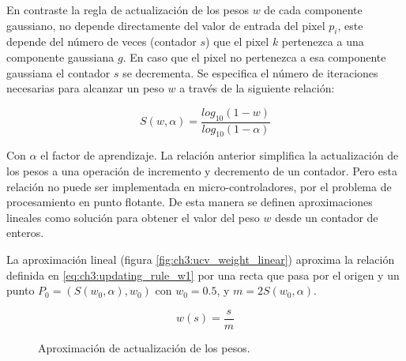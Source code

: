 En contraste la regla de actualización de los pesos $w$ de cada componente gaussiano, no depende directamente del valor de entrada del pixel $p_i$, este depende del número de veces (contador $s$) que el pixel $k$ pertenezca a una componente gaussiana $g$. En caso que el pixel no pertenezca a esa componente gaussiana el contador $s$ se decrementa. Se especifica el número de iteraciones necesarias para alcanzar un peso $w$ a través de la siguiente relación:

\begin{equation}\label{eq:ch3:updating_rule_w1}
S(w,\alpha)=\frac{log_{10}(1-w)}{log_{10}(1-\alpha)}
\end{equation}

Con $\alpha$ el factor de aprendizaje. La relación anterior simplifica la actualización de los pesos a una operación de incremento y decremento de un contador. Pero esta relación no puede ser implementada en micro-controladores, por el problema de procesamiento en punto flotante. De esta manera se definen  aproximaciones lineales como solución para obtener el valor del peso $w$ desde un contador de enteros. 

La aproximación lineal (figura \ref{fig:ch3:ucv_weight_linear}) aproxima la relación definida en \ref{eq:ch3:updating_rule_w1} por una recta que pasa por el origen y un punto $P_0=(S(w_0,\alpha), w_0)$ con $w_0=0.5$, y $m=2S(w_0,\alpha)$.


\[
w(s) = \frac{s}{m}
\]


\begin{figure}[!h]
\centering     %
{}
\caption[Aproximación de actualización de los pesos]{Aproximación de actualización de los pesos. }
\label{fig:ch3:ucv_weight}
\end{figure}


